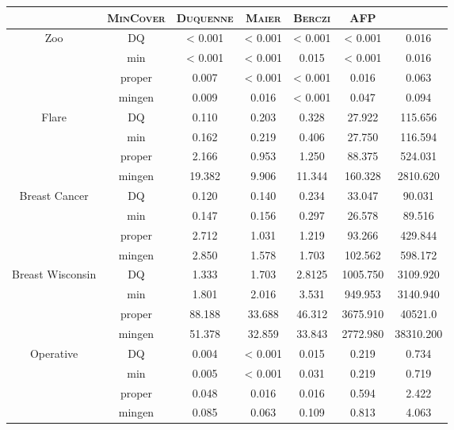 \begin{table}[ht]
	\centering
\begin{tabular}{| c | c || c | c | c | c | c |}
	\hline \rowcolor{clouds}
	\multicolumn{2}{c}{$\I$} & \textsc{MinCover} & \textsc{Duquenne} & \textsc{Maier} & \textsc{Berczi} & \textsc{AFP} \\ \hline
	
	\multirow{4}{*}{Zoo} & DQ & < 0.001 & < 0.001 & < 0.001 & < 0.001 & 0.016 \\
	& min & < 0.001 & < 0.001 & 0.015 & < 0.001 & 0.016 \\
	& proper & 0.007 & < 0.001 & < 0.001 & 0.016 & 0.063 \\
	& mingen & 0.009 & 0.016 & < 0.001 & 0.047 & 0.094 \\ \hline
	
	\multirow{4}{*}{Flare} & DQ & 0.110 & 0.203 & 0.328 & 27.922 & 115.656 \\
	& min & 0.162 & 0.219 & 0.406 & 27.750 & 116.594 \\
	& proper & 2.166 & 0.953 & 1.250 & 88.375 & 524.031 \\
	& mingen & 19.382 & 9.906 & 11.344 & 160.328 & 2810.620 \\ \hline
	
	\multirow{4}{*}{Breast Cancer} & DQ & 0.120 & 0.140 & 0.234 & 33.047 & 90.031 \\
	& min & 0.147 & 0.156 & 0.297 & 26.578 & 89.516 \\
	& proper & 2.712 & 1.031 & 1.219 & 93.266 & 429.844 \\
	& mingen & 2.850 & 1.578 & 1.703 & 102.562 & 598.172 \\ \hline
	
	\multirow{4}{*}{Breast Wisconsin} & DQ & 1.333 & 1.703 & 2.8125 & 1005.750 & 3109.920 \\
	& min & 1.801 & 2.016 & 3.531 & 949.953 & 3140.940 \\
	& proper & 88.188 & 33.688 & 46.312 & 3675.910 & 40521.0 \\
	& mingen & 51.378 & 32.859 & 33.843 & 2772.980 & 38310.200 \\ \hline
	
	\multirow{4}{*}{Operative} & DQ & 0.004 & < 0.001 & 0.015 & 0.219 & 0.734 \\
	& min & 0.005 & < 0.001 & 0.031 & 0.219 & 0.719 \\
	& proper & 0.048 & 0.016 & 0.016 & 0.594 & 2.422 \\
	& mingen & 0.085 & 0.063 & 0.109 & 0.813 & 4.063 \\ \hline
	

\end{tabular}
\end{table}
